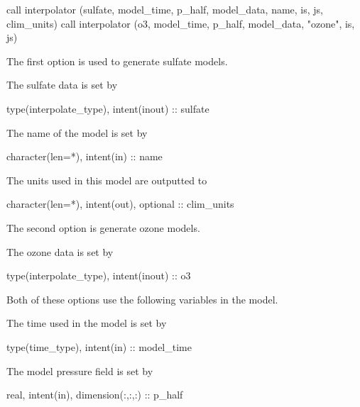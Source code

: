 
\begin{DoxyCode}
\textcolor{comment}{call interpolator (sulfate, model\_time, p\_half, model\_data, name, is, js, clim\_units)}
\textcolor{comment}{call interpolator (o3, model\_time, p\_half, model\_data, "ozone", is, js)}
\end{DoxyCode}


The first option is used to generate sulfate models.

The sulfate data is set by 
\begin{DoxyCode}
\textcolor{keywordtype}{type}(interpolate\_type), \textcolor{keywordtype}{intent(inout)} :: sulfate
\end{DoxyCode}
 The name of the model is set by 
\begin{DoxyCode}
\textcolor{comment}{character(len=*), intent(in) :: name}
\end{DoxyCode}
 The units used in this model are outputted to 
\begin{DoxyCode}
\textcolor{comment}{character(len=*), intent(out), optional :: clim\_units}
\end{DoxyCode}


The second option is generate ozone models.

The ozone data is set by 
\begin{DoxyCode}
\textcolor{keywordtype}{type}(interpolate\_type), \textcolor{keywordtype}{intent(inout)} :: o3
\end{DoxyCode}


Both of these options use the following variables in the model.

The time used in the model is set by


\begin{DoxyCode}
\textcolor{keywordtype}{type}(time\_type), \textcolor{keywordtype}{intent(in)} :: model\_time
\end{DoxyCode}
 The model pressure field is set by 
\begin{DoxyCode}
\textcolor{keywordtype}{real}, \textcolor{keywordtype}{intent(in)}, \textcolor{keywordtype}{dimension(:,:,:)} :: p\_half
\end{DoxyCode}



